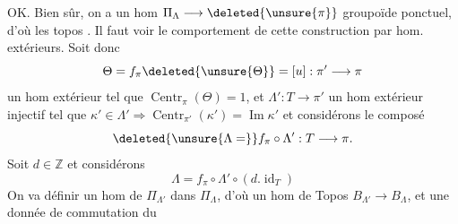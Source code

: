 OK. Bien sûr, on a un hom
\(\Pi_\Lambda\longrightarrow\deleted{\unsure{\pi}}\) groupoïde ponctuel, d'où
 les topos   .
Il faut voir le comportement de cette
construction par hom. extérieurs. Soit donc
\[
\Theta=f_\pi\deleted{\unsure{\Theta}}=[u]:\pi'\longrightarrow\pi
\]
un hom extérieur tel que \(\operatorname{Centr}_\pi(\Theta)=1\),
et \(\Lambda':T\longrightarrow\pi'\) un hom extérieur injectif
tel que \(\kappa'\in\Lambda'\Rightarrow\operatorname{Centr}_{\pi'}(\kappa')=\operatorname{Im}\kappa'\)
et considérons le composé
\[
\deleted{\unsure{\Lambda=}}f_\pi\circ\Lambda':T\longrightarrow\pi.
\]
Soit \(d\in\mathbb Z\) et considérons
\[
\Lambda=f_\pi\circ\Lambda'\circ(d.\operatorname{id}_T)
\]
On va définir un hom de \(\Pi_{\Lambda'}\) dans \(\Pi_\Lambda\),
d'où un hom de Topos \(B_{\Lambda'}\longrightarrow B_\Lambda\),
et une donnée de commutation \inserted{\(\alpha\)} du

